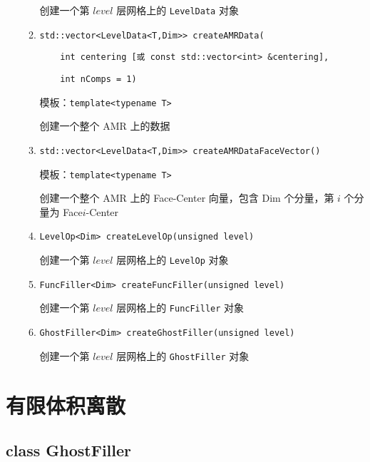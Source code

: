 \documentclass[cn, bibend=bibtex]{elegantpaper}
\theoremstyle{plain}
\begin{document}
\begin{itemize}
\begin{enumerate}
    创建一个第 $level$ 层网格上的 \lstinline|LevelData| 对象

    \item \lstinline|std::vector<LevelData<T,Dim>> createAMRData(|
    
    \lstinline|    int centering [或 const std::vector<int> &centering], |
    
    \lstinline|    int nComps = 1)|

    模板：\lstinline|template<typename T>|

    创建一个整个 AMR 上的数据

    \item \lstinline|std::vector<LevelData<T,Dim>> createAMRDataFaceVector()|

    模板：\lstinline|template<typename T>|

    创建一个整个 AMR 上的 Face-Center 向量，包含 Dim 个分量，第 $i$ 个分量为 Face$i$-Center

    \item \lstinline|LevelOp<Dim> createLevelOp(unsigned level)|

    创建一个第 $level$ 层网格上的 \lstinline|LevelOp| 对象

    \item \lstinline|FuncFiller<Dim> createFuncFiller(unsigned level)|

    创建一个第 $level$ 层网格上的 \lstinline|FuncFiller| 对象

    \item \lstinline|GhostFiller<Dim> createGhostFiller(unsigned level)|

    创建一个第 $level$ 层网格上的 \lstinline|GhostFiller| 对象
  \end{enumerate}
\end{itemize}

\section{有限体积离散}

\subsection{class GhostFiller}
\end{document}
